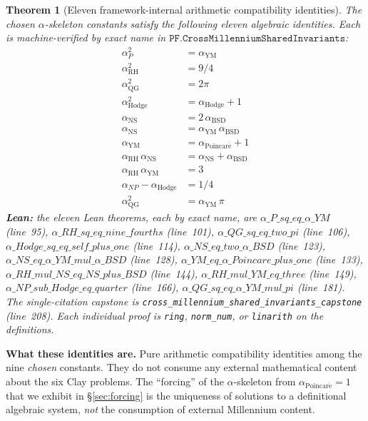 \documentclass[11pt,a4paper]{article}
\theoremstyle{plain}
\newtheorem{theorem}{Theorem}[section]
\theoremstyle{definition}
\begin{document}
\begin{theorem}[Eleven framework-internal arithmetic compatibility
identities]
\label{thm:eleven-invariants}
The chosen $\alpha$-skeleton constants satisfy the following
eleven algebraic identities. Each is machine-verified by exact
name in $\mathtt{PF.CrossMillenniumSharedInvariants}$:
\begin{align}
\alpha_{P}^{2} &= \alpha_{\mathrm{YM}}
  \label{inv:1} \\
\alpha_{\mathrm{RH}}^{2} &= 9/4
  \label{inv:2} \\
\alpha_{\mathrm{QG}}^{2} &= 2\pi
  \label{inv:3} \\
\alpha_{\mathrm{Hodge}}^{2} &= \alpha_{\mathrm{Hodge}} + 1
  \label{inv:4} \\
\alpha_{\mathrm{NS}} &= 2\,\alpha_{\mathrm{BSD}}
  \label{inv:5} \\
\alpha_{\mathrm{NS}} &= \alpha_{\mathrm{YM}}\,\alpha_{\mathrm{BSD}}
  \label{inv:6} \\
\alpha_{\mathrm{YM}} &= \alpha_{\mathrm{Poincar\acute e}} + 1
  \label{inv:7} \\
\alpha_{\mathrm{RH}}\,\alpha_{\mathrm{NS}} &=
  \alpha_{\mathrm{NS}} + \alpha_{\mathrm{BSD}}
  \label{inv:8} \\
\alpha_{\mathrm{RH}}\,\alpha_{\mathrm{YM}} &= 3
  \label{inv:9} \\
\alpha_{NP} - \alpha_{\mathrm{Hodge}} &= 1/4
  \label{inv:10} \\
\alpha_{\mathrm{QG}}^{2} &= \alpha_{\mathrm{YM}}\,\pi
  \label{inv:11}
\end{align}
\textbf{Lean:} the eleven Lean theorems, each by exact name, are
$\alpha\_P\_sq\_eq\_\alpha\_YM$ (line~95),
$\alpha\_RH\_sq\_eq\_nine\_fourths$ (line~101),
$\alpha\_QG\_sq\_eq\_two\_pi$ (line~106),
$\alpha\_Hodge\_sq\_eq\_self\_plus\_one$ (line~114),
$\alpha\_NS\_eq\_two\_\alpha\_BSD$ (line~123),
$\alpha\_NS\_eq\_\alpha\_YM\_mul\_\alpha\_BSD$ (line~128),
$\alpha\_YM\_eq\_\alpha\_Poincare\_plus\_one$ (line~133),
$\alpha\_RH\_mul\_NS\_eq\_NS\_plus\_BSD$ (line~144),
$\alpha\_RH\_mul\_YM\_eq\_three$ (line~149),
$\alpha\_NP\_sub\_Hodge\_eq\_quarter$ (line~166),
$\alpha\_QG\_sq\_eq\_\alpha\_YM\_mul\_pi$ (line~181). The
single-citation capstone is
\texttt{cross\_millennium\_shared\_invariants\_capstone}
(line~208). Each individual proof is \texttt{ring},
\texttt{norm\_num}, or \texttt{linarith} on the definitions.
\end{theorem}

\medskip

\noindent\textbf{What these identities are.} Pure arithmetic
compatibility identities among the nine \emph{chosen} constants.
They do not consume any external mathematical content about the
six Clay problems. The ``forcing'' of the $\alpha$-skeleton from
$\alpha_{\mathrm{Poincar\acute e}} = 1$ that we exhibit in
\S\ref{sec:forcing} is the uniqueness of solutions to a
definitional algebraic system, \emph{not} the consumption of
external Millennium content.
\end{document}
